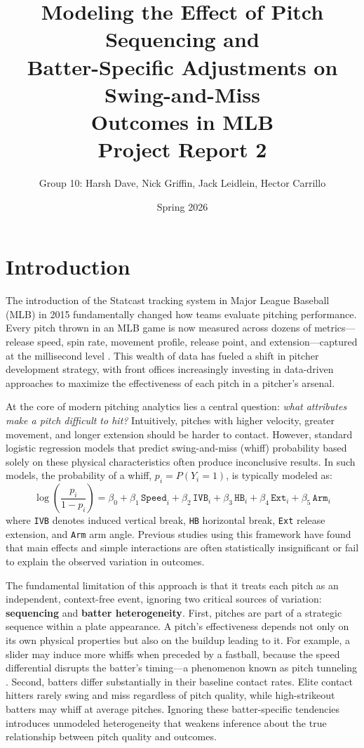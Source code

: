 \documentclass[11pt]{article}
\title{\textbf{Modeling the Effect of Pitch Sequencing and\\
Batter-Specific Adjustments on Swing-and-Miss\\
Outcomes in MLB} \\[6pt]
\large Project Report 2}
\author{Group 10: Harsh Dave, Nick Griffin, Jack Leidlein, Hector Carrillo}
\date{Spring 2026}
\begin{document}
\maketitle

\section{Introduction}

The introduction of the Statcast tracking system in Major League Baseball (MLB) in 2015 fundamentally changed how teams evaluate pitching performance.
Every pitch thrown in an MLB game is now measured across dozens of metrics---release speed, spin rate, movement profile, release point, and extension---captured at the millisecond level \citep{statcast2024}.
This wealth of data has fueled a shift in pitcher development strategy, with front offices increasingly investing in data-driven approaches to maximize the effectiveness of each pitch in a pitcher's arsenal.

At the core of modern pitching analytics lies a central question: \textit{what attributes make a pitch difficult to hit?}
Intuitively, pitches with higher velocity, greater movement, and longer extension should be harder to contact.
However, standard logistic regression models that predict swing-and-miss (whiff) probability based solely on these physical characteristics often produce inconclusive results.
In such models, the probability of a whiff, $p_i = P(Y_i = 1)$, is typically modeled as:
%
\begin{equation}\label{eq:baseline}
    \log\!\left(\frac{p_i}{1 - p_i}\right)
    = \beta_0
    + \beta_1 \,\texttt{Speed}_i
    + \beta_2 \,\texttt{IVB}_i
    + \beta_3 \,\texttt{HB}_i
    + \beta_4 \,\texttt{Ext}_i
    + \beta_5 \,\texttt{Arm}_i
\end{equation}
%
where \texttt{IVB} denotes induced vertical break, \texttt{HB} horizontal break, \texttt{Ext} release extension, and \texttt{Arm} arm angle.
Previous studies using this framework have found that main effects and simple interactions are often statistically insignificant or fail to explain the observed variation in outcomes.

The fundamental limitation of this approach is that it treats each pitch as an independent, context-free event, ignoring two critical sources of variation: \textbf{sequencing} and \textbf{batter heterogeneity}.
First, pitches are part of a strategic sequence within a plate appearance.
A pitch's effectiveness depends not only on its own physical properties but also on the buildup leading to it.
For example, a slider may induce more whiffs when preceded by a fastball, because the speed differential disrupts the batter's timing---a phenomenon known as pitch tunneling \citep{toporek2017tunneling}.
Second, batters differ substantially in their baseline contact rates.
Elite contact hitters rarely swing and miss regardless of pitch quality, while high-strikeout batters may whiff at average pitches.
Ignoring these batter-specific tendencies introduces unmodeled heterogeneity that weakens inference about the true relationship between pitch quality and outcomes.
\end{document}
